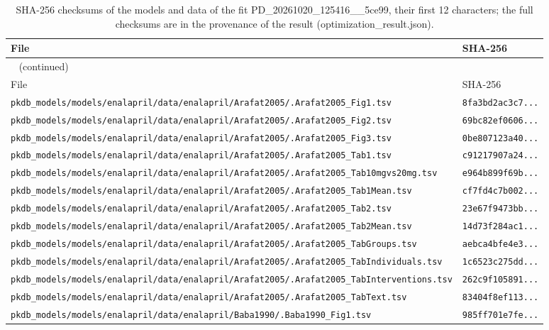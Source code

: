 \documentclass{article}
\begin{document}
\begin{longtable}{ll}
\caption{SHA-256 checksums of the models and data of the fit PD\_20261020\_125416\_\_5ce99, their first 12 characters; the full checksums are in the provenance of the result (optimization\_result.json).}\label{tab:checksums:PD_20261020_125416__5ce99} \\
\toprule
File & SHA-256 \\
\midrule
\endfirsthead
\multicolumn{2}{l}{\small\tablename~\thetable{} (continued)} \\
\toprule
File & SHA-256 \\
\midrule
\endhead
\bottomrule
\endlastfoot
\texttt{pkdb\_models/models/enalapril/data/enalapril/Arafat2005/.Arafat2005\_Fig1.tsv} & \texttt{8fa3bd2ac3c7...} \\
\texttt{pkdb\_models/models/enalapril/data/enalapril/Arafat2005/.Arafat2005\_Fig2.tsv} & \texttt{69bc82ef0606...} \\
\texttt{pkdb\_models/models/enalapril/data/enalapril/Arafat2005/.Arafat2005\_Fig3.tsv} & \texttt{0be807123a40...} \\
\texttt{pkdb\_models/models/enalapril/data/enalapril/Arafat2005/.Arafat2005\_Tab1.tsv} & \texttt{c91217907a24...} \\
\texttt{pkdb\_models/models/enalapril/data/enalapril/Arafat2005/.Arafat2005\_Tab10mgvs20mg.tsv} & \texttt{e964b899f69b...} \\
\texttt{pkdb\_models/models/enalapril/data/enalapril/Arafat2005/.Arafat2005\_Tab1Mean.tsv} & \texttt{cf7fd4c7b002...} \\
\texttt{pkdb\_models/models/enalapril/data/enalapril/Arafat2005/.Arafat2005\_Tab2.tsv} & \texttt{23e67f9473bb...} \\
\texttt{pkdb\_models/models/enalapril/data/enalapril/Arafat2005/.Arafat2005\_Tab2Mean.tsv} & \texttt{14d73f284ac1...} \\
\texttt{pkdb\_models/models/enalapril/data/enalapril/Arafat2005/.Arafat2005\_TabGroups.tsv} & \texttt{aebca4bfe4e3...} \\
\texttt{pkdb\_models/models/enalapril/data/enalapril/Arafat2005/.Arafat2005\_TabIndividuals.tsv} & \texttt{1c6523c275dd...} \\
\texttt{pkdb\_models/models/enalapril/data/enalapril/Arafat2005/.Arafat2005\_TabInterventions.tsv} & \texttt{262c9f105891...} \\
\texttt{pkdb\_models/models/enalapril/data/enalapril/Arafat2005/.Arafat2005\_TabText.tsv} & \texttt{83404f8ef113...} \\
\texttt{pkdb\_models/models/enalapril/data/enalapril/Baba1990/.Baba1990\_Fig1.tsv} & \texttt{985ff701e7fe...} \\

\end{longtable}
\end{document}
